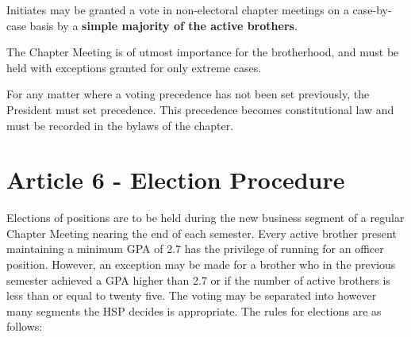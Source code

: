 \documentclass{article}
\begin{document}
Initiates may be granted a vote in non-electoral chapter meetings on a case-by-case basis by a \textbf{simple majority of the active brothers}.

The Chapter Meeting is of utmost importance for the brotherhood, and must be held with exceptions granted for only extreme cases.

For any matter where a voting precedence has not been set previously, the President must set precedence. This precedence becomes constitutional law and must be recorded in the bylaws of the chapter.

\section*{Article 6 - Election Procedure}
\hspace*{1cm}Elections of positions are to be held during the new business segment of a regular Chapter Meeting nearing the end of each semester. Every active brother present maintaining a minimum GPA of 2.7  has the privilege of running for an officer position. However, an exception may be made for a brother who in the previous semester achieved a GPA higher than 2.7 or if the number of active brothers is less than or equal to twenty five. The voting may be separated into however many segments the HSP decides is appropriate. The rules for elections are as follows:
\end{document}
